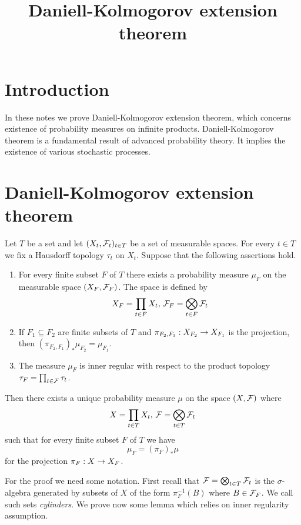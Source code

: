 \documentclass[10pt]{amsart}
\begin{document}
\title{Daniell-Kolmogorov extension theorem}
\date{}
\maketitle

\section{Introduction}
\noindent
In these notes we prove Daniell-Kolmogorov extension theorem, which concerns existence of probability measures on infinite products. Daniell-Kolmogorov theorem is a fundamental result of advanced probability theory. It implies the existence of various stochastic processes.

\section{Daniell-Kolmogorov extension theorem}

\begin{theorem}\label{theorem:Daniell_Kolmogorov_extension}
	Let $T$ be a set and let $(X_t,{\mathcal F}_t)_{t\in T}$ be a set of measurable spaces. For every $t\in T$ we fix a Hausdorff topology $\tau_t$ on $X_t$. Suppose that the following assertions hold.
	\begin{enumerate}[label=\emph{\textbf{(\arabic*)}}, leftmargin=*]
		\item For every finite subset $F$ of $T$ there exists a probability measure $\mu_F$ on the measurable space $(X_F,{\mathcal F}_F)$. The space is defined by
		      $$X_F = \prod_{t\in F}X_t,\,{\mathcal F}_F = \bigotimes_{t\in F}{\mathcal F}_t$$
		\item If $F_1\subseteq F_2$ are finite subsets of $T$ and $\pi_{F_2,F_1}:X_{F_2}\rightarrow X_{F_1}$ is the projection, then $\left(\pi_{F_2,F_1}\right)_*\mu_{F_2} = \mu_{F_1}$.
		\item The measure $\mu_F$ is inner regular with respect to the product topology $\tau_F = \prod_{t\in {\mathcal F}}\tau_t$.
	\end{enumerate}
	Then there exists a unique probability measure $\mu$ on the space $(X,{\mathcal F})$ where
	$$X = \prod_{t\in T}X_t,\,{\mathcal F} = \bigotimes_{t\in T}{\mathcal F}_t$$
	such that for every finite subset $F$ of $T$ we have
	$$\mu_F = \left(\pi_F\right)_*\mu$$
	for the projection $\pi_F:X\rightarrow X_F$.
\end{theorem}
\noindent
For the proof we need some notation. First recall that ${\mathcal F} = \bigotimes_{t\in T}{\mathcal F}_t$ is the $\sigma$-algebra generated by subsets of $X$ of the form $\pi_F^{-1}(B)$ where $B\in {\mathcal F}_F$. We call such sets \textit{cylinders}. We prove now some lemma which relies on inner regularity assumption.
\end{document}

